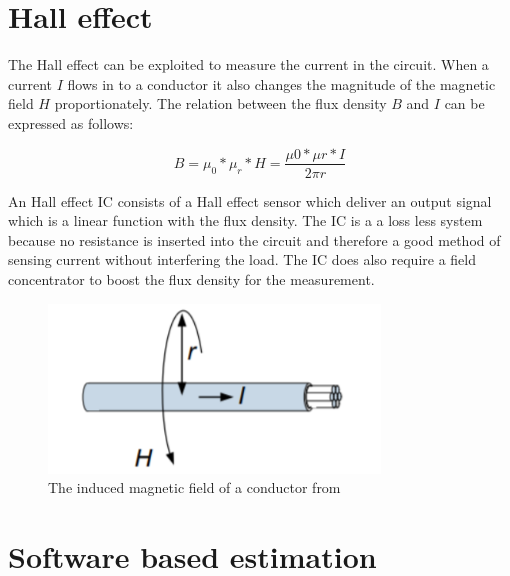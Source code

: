 \section{Hall effect}
The Hall effect can be exploited to measure the current in the circuit. When a current $I$ flows in to a conductor it also changes the magnitude of the magnetic field $H$ proportionately. The relation between the flux density $B$ and $I$ can be expressed as follows:


\begin{equation}
B= \mu_{0}*\mu_{r}*H= \frac{\mu{0}*\mu{r}*I}{2\pi r}
\end{equation}

An Hall effect IC consists of a Hall effect sensor which deliver an output signal which is a linear function with the flux density. The IC is a a loss less system because no resistance is inserted into the circuit and therefore a good method of sensing current without interfering the load.  The IC does also require a field concentrator to boost the flux density for the measurement.
\begin{figure}[ht]
\centering
\includegraphics[height=4.5cm]{Project_Report/Images/current.PNG}
\caption{The induced magnetic field of a conductor from \cite{Infineon}}
\label{fig:current}
\end{figure}


\section{Software based estimation}

